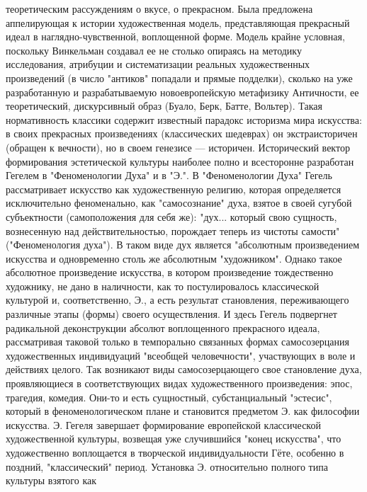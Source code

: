 \documentclass[12pt]{article}
\begin{document}
теоретическим  рассуждениям  о  вкусе,  о  прекрасном.  Была  предложена  аппелирующая  к  истории
художественная  модель,  представляющая  прекрасный  идеал  в  наглядно-чувственной,  воплощенной  форме.
Модель крайне условная, поскольку Винкельман создавал ее не столько опираясь на методику исследования,
атрибуции и систематизации реальных художественных произведений (в число "антиков" попадали и прямые
подделки), сколько на уже разработанную и разрабатываемую новоевропейскую метафизику Античности, ее
теоретический, дискурсивный образ (Буало, Берк, Батте, Вольтер). Такая нормативность классики содержит
известный парадокс историзма мира искусства: в своих прекрасных произведениях (классических шедеврах) он
экстраисторичен (обращен к вечности), но в своем генезисе — историчен. Исторический вектор формирования
эстетической культуры наиболее полно и всесторонне разработан Гегелем в "Феноменологии Духа" и в "Э.". В
"Феноменологии Духа" Гегель рассматривает искусство как художественную религию, которая определяется
исключительно феноменально, как "самосознание" духа, взятое в своей сугубой субъектности (самоположения
для  себя  же):  "дух...  который  свою  сущность,  вознесенную  над  действительностью,  порождает  теперь  из
чистоты самости" ("Феноменология духа"). В таком виде дух является "абсолютным произведением искусства и
одновременно  столь  же  абсолютным  "художником".  Однако  такое  абсолютное  произведение  искусства,  в
котором произведение тождественно художнику, не дано в наличности, как то постулировалось классической
культурой  и,  соответственно,  Э.,  а  есть  результат  становления,  переживающего  различные  этапы  (формы)
своего  осуществления.  И  здесь  Гегель  подвергнет  радикальной  деконструкции  абсолют  воплощенного
прекрасного  идеала,  рассматривая  таковой  только  в  темпорально  связанных  формах  самосозерцания
художественных  индивидуаций  "всеобщей  человечности",  участвующих  в  воле  и  действиях  целого.  Так
возникают  виды  самосозерцающего  свое  становление  духа,  проявляющиеся  в  соответствующих  видах
художественного  произведения:  эпос,  трагедия,  комедия.  Они-то  и  есть  сущностный,  субстанциальный
"эстесис",  который в феноменологическом плане и становится предметом  Э. как  философии искусства.  Э.
Гегеля  завершает  формирование  европейской  классической  художественной  культуры,  возвещая  уже
случившийся  "конец  искусства",  что  художественно  воплощается  в  творческой  индивидуальности  Гёте,
особенно в поздний, "классический" период. Установка Э. относительно полного типа культуры взятого как
\end{document}
